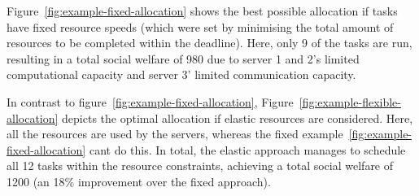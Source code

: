 Figure~\ref{fig:example-fixed-allocation} shows the best possible allocation if tasks have fixed resource speeds (which
were set by minimising the total amount of resources to be completed within the deadline). Here, only 9 of the tasks
are run, resulting in a total social welfare of 980 due to server 1 and 2's limited computational capacity and server
3' limited communication capacity.

In contrast to figure~\ref{fig:example-fixed-allocation}, Figure~\ref{fig:example-flexible-allocation} depicts the
optimal allocation if elastic resources are considered. Here, all the resources are used by the servers, whereas the
fixed example~\ref{fig:example-fixed-allocation} cant do this. In total, the elastic approach manages to schedule all
12 tasks within the resource constraints, achieving a total social welfare of 1200 (an 18\% improvement over the fixed
approach).